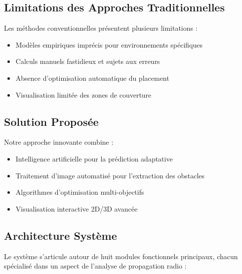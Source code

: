 \documentclass[12pt,a4paper]{article}
\begin{document}
\subsection{Limitations des Approches Traditionnelles}

Les méthodes conventionnelles présentent plusieurs limitations :
\begin{itemize}
    \item Modèles empiriques imprécis pour environnements spécifiques
    \item Calculs manuels fastidieux et sujets aux erreurs
    \item Absence d'optimisation automatique du placement
    \item Visualisation limitée des zones de couverture
\end{itemize}

\subsection{Solution Proposée}

Notre approche innovante combine :
\begin{itemize}
    \item Intelligence artificielle pour la prédiction adaptative
    \item Traitement d'image automatisé pour l'extraction des obstacles
    \item Algorithmes d'optimisation multi-objectifs
    \item Visualisation interactive 2D/3D avancée
\end{itemize}

\subsection{Architecture Système}

Le système s'articule autour de huit modules fonctionnels principaux, chacun spécialisé dans un aspect de l'analyse de propagation radio :
\end{document}
